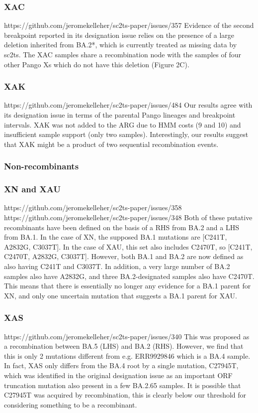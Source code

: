 \documentclass[12pt,letterpaper]{article}
\begin{document}
\subsubsection*{XAC}
https://github.com/jeromekelleher/sc2ts-paper/issues/357
Evidence of the second breakpoint reported in its designation issue relies on
the presence of a large deletion inherited from BA.2*, which is currently treated as missing data by sc2ts.
The XAC samples share a recombination node with the samples of four other Pango Xs
which do not have this deletion (Figure 2C).

\subsubsection*{XAK}
https://github.com/jeromekelleher/sc2ts-paper/issues/484
Our results agree with its designation issue in terms of the parental Pango lineages and breakpoint intervals.
XAK was not added to the ARG due to HMM costs (9 and 10) and insufficient sample support (only two samples).
Interestingly, our results suggest that XAK might be a product of two sequential recombination events.

\subsubsection*{Non-recombinants}
\subsubsection*{XN and XAU}
https://github.com/jeromekelleher/sc2ts-paper/issues/358
https://github.com/jeromekelleher/sc2ts-paper/issues/348
Both of these putative recombinants have been defined on the basis of a RHS from BA.2 and a LHS from BA.1.
In the case of XN, the supposed BA.1 mutations are [C241T, A2832G, C3037T].
In the case of XAU, this set also includes C2470T, so [C241T, C2470T, A2832G, C3037T].
However, both BA.1 and BA.2 are now defined as also having C241T and C3037T.
In addition, a very large number of BA.2 samples also have A2832G, and three BA.2-designated samples also have C2470T.
This means that there is essentially no longer any evidence for a BA.1 parent for XN, and
only one uncertain mutation that suggests a BA.1 parent for XAU.

\subsubsection*{XAS}
https://github.com/jeromekelleher/sc2ts-paper/issues/340
This was proposed as a recombination between BA.5 (LHS) and BA.2 (RHS).
However, we find that this is only 2 mutations different from e.g. ERR9929846 which is a BA.4 sample.
In fact, XAS only differs from the BA.4 root by a single mutation, C27945T,
which was identified in the original designation issue as an important ORF truncation mutation also present in a few BA.2.65 samples.
It is possible that C27945T was acquired by recombination, this is clearly below our threshold for considering something to be a recombinant.
\end{document}
